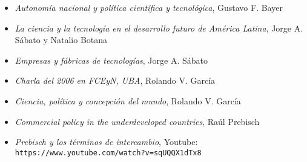 \begin{itemize}
    \item \textit{Autonomía nacional y política científica y tecnológica}, Gustavo F. Bayer
    \item \textit{La ciencia y la tecnología en el desarrollo futuro de América Latina}, Jorge A. Sábato y Natalio Botana
    \item \textit{Empresas y fábricas de tecnologías}, Jorge A. Sábato
    \item \textit{Charla del 2006 en FCEyN, UBA}, Rolando V. García
    \item \textit{Ciencia, política y concepción del mundo}, Rolando V. García
    \item \textit{Commercial policy in the underdeveloped countries}, Raúl Prebisch
    \item \textit{Prebisch y los términos de intercambio}, Youtube: \texttt{https://www.youtube.com/watch?v=sqUQQX1dTx8}
\end{itemize}
